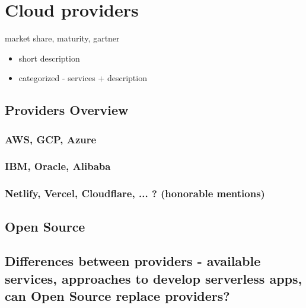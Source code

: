 \chapter{Cloud providers}

market share, maturity, gartner

\begin{itemize}
    \item short description
    \item categorized - services + description
\end{itemize}

\section*{Providers Overview}

\subsection*{AWS, GCP, Azure}

\subsection*{IBM, Oracle, Alibaba}

\subsection*{Netlify, Vercel, Cloudflare, ... ? (honorable mentions)}

\section*{Open Source}


\section*{Differences between providers - available services, approaches to develop serverless apps, can Open Source replace providers?}